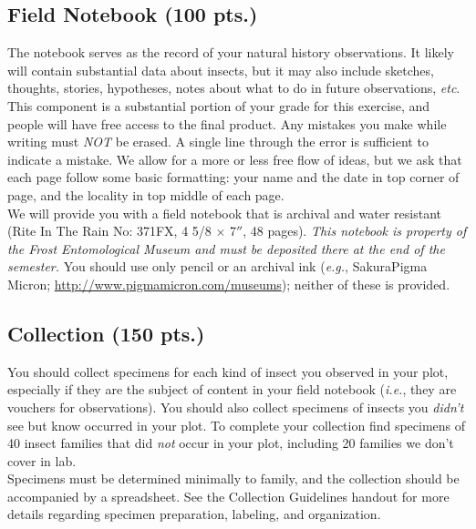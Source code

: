 \documentclass[letterpaper, 11pt]{article}
\begin{document}
\subsection*{Field Notebook (100 pts.)}
The notebook serves as the record of your natural history observations. It likely will contain substantial data about insects, but it may also include sketches, thoughts, stories, hypotheses, notes about what to do in future observations, \textit{etc}. This component is a substantial portion of your grade for this exercise, and people will have free access to the final product. Any mistakes you make while writing must \textit{NOT} be erased. A single line through the error is sufficient to indicate a mistake. We allow for a more or less free flow of ideas, but we ask that each page follow some basic formatting: your name and the date in top corner of page, and the locality in top middle of each page.\\

\noindent{}We will provide you with a field notebook that is archival and water resistant (Rite In The Rain No: 371FX, 4 5/8 $\times$ 7$''$, 48 pages). \textit{This notebook is property of the Frost Entomological Museum and must be deposited there at the end of the semester.} You should use only pencil or an archival ink (\textit{e.g.}, Sakura\textregistered{ }Pigma Micron\textregistered; \url{http://www.pigmamicron.com/museums}); neither of these is provided. 

\subsection*{Collection (150 pts.)}
You should collect specimens for each kind of insect you observed in your plot, especially if they are the subject of content in your field notebook (\textit{i.e.}, they are vouchers for observations). You should also collect specimens of insects you \textit{didn't} see but know occurred in your plot. To complete your collection find specimens of 40 insect families that did \textit{not} occur in your plot, including 20 families we don't cover in lab.\\

\noindent{}Specimens must be determined minimally to family, and the collection should be accompanied by a spreadsheet. See the Collection Guidelines handout for more details regarding specimen preparation, labeling, and organization.
\end{document}
